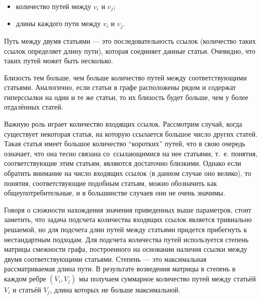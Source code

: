 \begin{itemize}

\item{
количество путей между $v_i$ и $v_j$;
}

\item {
длины каждого пути между $v_i$ и $v_j$.
}

\end{itemize}

Путь между двумя статьями --- это последовательность ссылок 
(количество таких ссылок определяет длину пути),
которая соединяет данные статьи. 
Очевидно, что таких путей может быть несколько. 

Близость тем больше, чем больше количество путей между соответствующими статьями. 
Аналогично, если статьи в графе расположены рядом и содержат гиперссылки на
одни и те же статьи, то их близость будет больше, чем у более  отдалённых статей.

Важную роль играет количество входящих ссылок. 
Рассмотрим случай, когда существует некоторая статья, на которую ссылается большое число других статей. 
Такая статья имеет большое количество ``коротких'' путей, что в свою очередь означает,
что она тесно связана со~ссылающимися на нее статьями, 
т.~е. понятия, соответствующие этим статьям, являются достаточно близкими. 
Однако если обратить внимание на число входящих ссылок (в данном случае оно велико), 
то понятия, соответствующие подобным статьям, можно обозначить как общеупотребительные,
и в большинстве случаев они не очень значимы. 

Говоря о сложности нахождения значения приведенных выше параметров, стоит заметить, что
задача подсчета количества входящих ссылок является тривиально решаемой, но для 
подсчета длин путей между статьями придется прибегнуть к нестандартным подходам. 
Для подсчета количества путей используется степень матрицы смежности графа, 
построенного на основании наличия ссылки между двумя соответствующими статьями. 
Степень --- это максимальная рассматриваемая длина пути. В результате возведения матрицы
в степень в каждом ребре $(V_i, V_j)$ мы получаем суммарное количество путей между статьёй $V_i$  и статьёй $V_j$,
длина которых не больше максимальной. 

